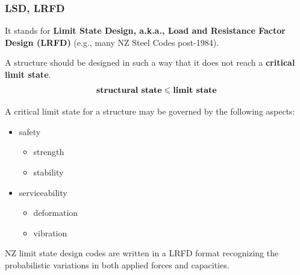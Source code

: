 \subsubsection{LSD, LRFD}
It stands for \textbf{Limit State Design, a.k.a., Load and Resistance Factor Design (LRFD)} (e.g., many NZ Steel Codes post-1984).

A structure should be designed in such a way that it does not reach a \textbf{critical limit state}.
\begin{gather*}
\text{\bfseries{}structural state}\leqslant\text{\bfseries{}limit state}
\end{gather*}

A critical limit state for a structure may be governed by the following aspects:
\begin{itemize}
\item safety
\begin{itemize}
\item strength
\item stability
\end{itemize}
\item serviceability
\begin{itemize}
\item deformation
\item vibration
\end{itemize}
\end{itemize}

NZ limit state design codes are written in a LRFD format recognizing the probabilistic variations in both applied forces and capacities.

